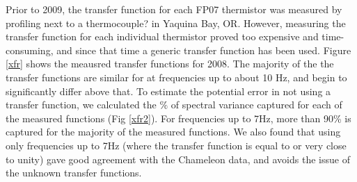 \documentclass{ametsoc}
\begin{document}
Prior to 2009, the transfer function for each FP07 thermistor was measured by profiling next to a thermocouple? in Yaquina Bay, OR. However, measuring the transfer function for each individual thermistor proved too expensive and time-consuming, and since that time a generic transfer function has been used. Figure \ref{xfr} shows the meausred transfer functions for 2008. The majority of the the transfer functions are similar for at frequencies up to about 10 Hz, and begin to significantly differ above that. To estimate the potential error in not using a transfer function, we calculated the $\%$ of spectral variance captured for each of the measured functions (Fig \ref{xfr2}). For frequencies up to 7Hz, more than 90\% is captured for the majority of the measured functions. We also found that using only frequencies up to 7Hz (where the transfer function is equal to or very close to unity) gave good agreement with the Chameleon data, and avoids the issue of the unknown transfer functions.







%
%
%
 
 
\end{document}

